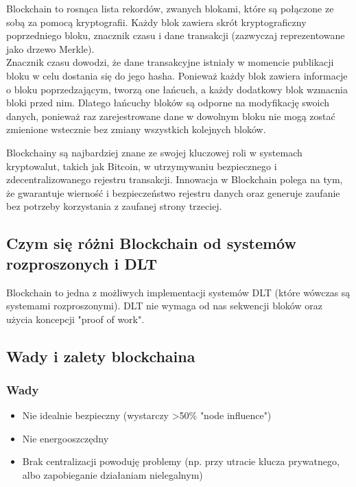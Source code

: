 \documentclass[12pt]{article}
\begin{document}
Blockchain to rosnąca lista rekordów, zwanych blokami, które są połączone ze sobą za pomocą kryptografii. Każdy blok zawiera skrót kryptograficzny poprzedniego bloku, znacznik czasu i dane transakcji (zazwyczaj reprezentowane jako drzewo Merkle). \\
Znacznik czasu dowodzi, że dane transakcyjne istniały w momencie publikacji bloku w celu dostania się do jego hasha. Ponieważ każdy blok zawiera informacje o bloku poprzedzającym, tworzą one łańcuch, a każdy dodatkowy blok wzmacnia bloki przed nim. Dlatego łańcuchy bloków są odporne na modyfikację swoich danych, ponieważ raz zarejestrowane dane w dowolnym bloku nie mogą zostać zmienione wstecznie bez zmiany wszystkich kolejnych bloków. \cite{wiki-blockchain}

Blockchainy są najbardziej znane ze swojej kluczowej roli w systemach kryptowalut, takich jak Bitcoin, w utrzymywaniu bezpiecznego i zdecentralizowanego rejestru transakcji. Innowacja w Blockchain polega na tym, że gwarantuje wierność i bezpieczeństwo rejestru danych oraz generuje zaufanie bez potrzeby korzystania z zaufanej strony trzeciej.



\subsection{Czym się różni Blockchain od systemów rozproszonych i DLT}

Blockchain to jedna z możliwych implementacji systemów DLT (które wówczas są systemami rozproszonymi). DLT nie wymaga od nas sekwencji bloków oraz użycia koncepcji "proof of work".

\subsection{Wady i zalety blockchaina}

\subsubsection{Wady}
\begin{itemize}
  \item Nie idealnie bezpieczny (wystarczy >50\% "node influence")
  \item Nie energooszczędny
  \item Brak centralizacji powoduję problemy (np. przy utracie klucza prywatnego, albo zapobieganie działaniam nielegalnym)
\end{itemize}
\end{document}
